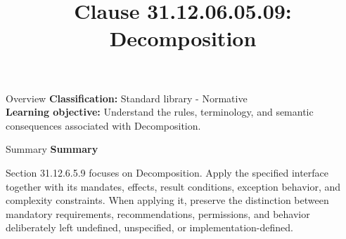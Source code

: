 \documentclass[10pt,letterpaper]{article}
\title{Clause 31.12.06.05.09: Decomposition}
\author{}
\date{}
\begin{document}
\maketitle
\begin{CornellOverviewBox}{Overview}
\textbf{Classification:} Standard library - Normative\\[2pt]
\textbf{Learning objective:} Understand the rules, terminology, and semantic consequences associated with Decomposition.
\end{CornellOverviewBox}\begin{CornellSummaryBox}{Summary}
{\sffamily\bfseries\color{Accent} Summary}\par\vspace{3pt}Section 31.12.6.5.9 focuses on Decomposition. Apply the specified interface together with its mandates, effects, result conditions, exception behavior, and complexity constraints. When applying it, preserve the distinction between mandatory requirements, recommendations, permissions, and behavior deliberately left undefined, unspecified, or implementation-defined.
\end{CornellSummaryBox}
\end{document}
